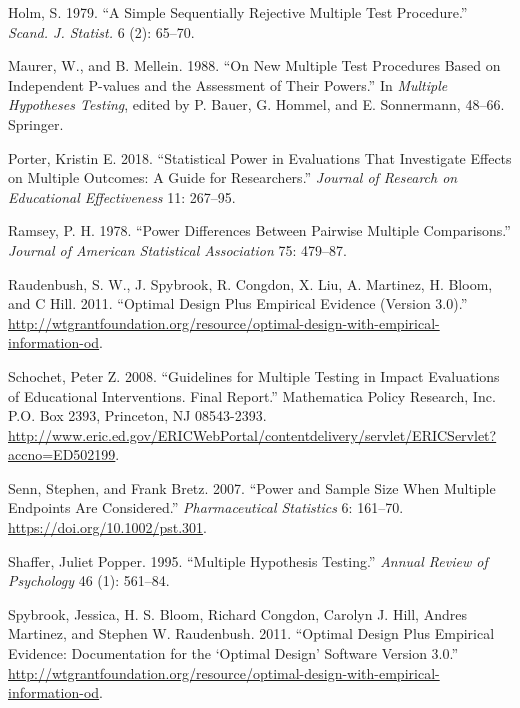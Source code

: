 \documentclass{article}
\newlength{\cslhangindent}
\newlength{\cslentryspacingunit} %
\newenvironment{CSLReferences}[2] %
 {%
  \setlength{\parindent}{0pt}
  \ifodd #1
  \let\oldpar\par
  \def\par{\hangindent=\cslhangindent\oldpar}
  \fi
  \setlength{\parskip}{#2\cslentryspacingunit}
 }%
 {}
\begin{document}
\begin{CSLReferences}{1}{0}
\leavevmode{}%
Holm, S. 1979. {``A Simple Sequentially Rejective Multiple Test
Procedure.''} \emph{Scand. J. Statist.} 6 (2): 65--70.

\leavevmode{}%
Maurer, W., and B. Mellein. 1988. {``On New Multiple Test Procedures
Based on Independent {P-values} and the Assessment of Their Powers.''}
In \emph{Multiple Hypotheses Testing}, edited by P. Bauer, G. Hommel,
and E. Sonnermann, 48--66. Springer.

\leavevmode{}%
Porter, Kristin E. 2018. {``Statistical Power in Evaluations That
Investigate Effects on Multiple Outcomes: A Guide for Researchers.''}
\emph{Journal of Research on Educational Effectiveness} 11: 267--95.

\leavevmode{}%
Ramsey, P. H. 1978. {``Power Differences Between Pairwise Multiple
Comparisons.''} \emph{Journal of American Statistical Association} 75:
479--87.

\leavevmode{}%
Raudenbush, S. W., J. Spybrook, R. Congdon, X. Liu, A. Martinez, H.
Bloom, and C Hill. 2011. {``Optimal Design Plus Empirical Evidence
(Version 3.0).''}
\url{http://wtgrantfoundation.org/resource/optimal-design-with-empirical-information-od}.

\leavevmode{}%
Schochet, Peter Z. 2008. {``Guidelines for Multiple Testing in Impact
Evaluations of Educational Interventions. Final Report.''} Mathematica
Policy Research, Inc. P.O. Box 2393, Princeton, NJ 08543-2393.
\url{http://www.eric.ed.gov/ERICWebPortal/contentdelivery/servlet/ERICServlet?accno=ED502199}.

\leavevmode{}%
Senn, Stephen, and Frank Bretz. 2007. {``Power and Sample Size When
Multiple Endpoints Are Considered.''} \emph{Pharmaceutical Statistics}
6: 161--70. \url{https://doi.org/10.1002/pst.301}.

\leavevmode{}%
Shaffer, Juliet Popper. 1995. {``Multiple Hypothesis Testing.''}
\emph{Annual Review of Psychology} 46 (1): 561--84.

\leavevmode{}%
Spybrook, Jessica, H. S. Bloom, Richard Congdon, Carolyn J. Hill, Andres
Martinez, and Stephen W. Raudenbush. 2011. {``Optimal Design Plus
Empirical Evidence: Documentation for the {`Optimal Design'} Software
Version 3.0.''}
\url{http://wtgrantfoundation.org/resource/optimal-design-with-empirical-information-od}.


\end{CSLReferences}
\end{document}
